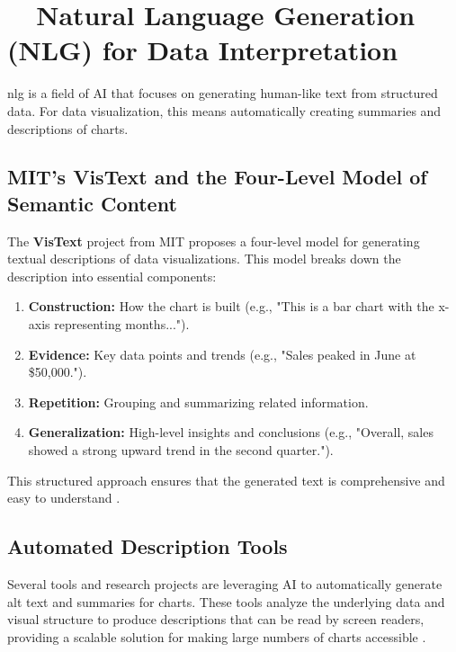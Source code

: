 \section{~~Natural Language Generation (NLG) for Data Interpretation}\label{ch13:sec:nlg}
\gls{nlg} is a field of \gls{AI} that focuses on generating human-like text from structured data. For data visualization, this means automatically creating summaries and descriptions of charts.

\subsection{MIT's VisText and the Four-Level Model of Semantic Content}\label{ch13:ssec:vistext}
The \textbf{VisText} project from MIT proposes a four-level model for generating textual descriptions of data visualizations. This model breaks down the description into essential components:
\begin{enumerate}
	\item \textbf{Construction:} How the chart is built (e.g., "This is a bar chart with the x-axis representing months...").
	\item \textbf{Evidence:} Key data points and trends (e.g., "Sales peaked in June at \$50,000.").
	\item \textbf{Repetition:} Grouping and summarizing related information.
	\item \textbf{Generalization:} High-level insights and conclusions (e.g., "Overall, sales showed a strong upward trend in the second quarter.").
\end{enumerate}
This structured approach ensures that the generated text is comprehensive and easy to understand \supercite{VisText, Lundgard2022Accessible}.

\subsection{Automated Description Tools}\label{ch13:ssec:automated-description}
Several tools and research projects are leveraging \gls{AI} to automatically generate alt text and summaries for charts. These tools analyze the underlying data and visual structure to produce descriptions that can be read by screen readers, providing a scalable solution for making large numbers of charts accessible \supercite{Smits2024AltGosling, SeeChart}.

